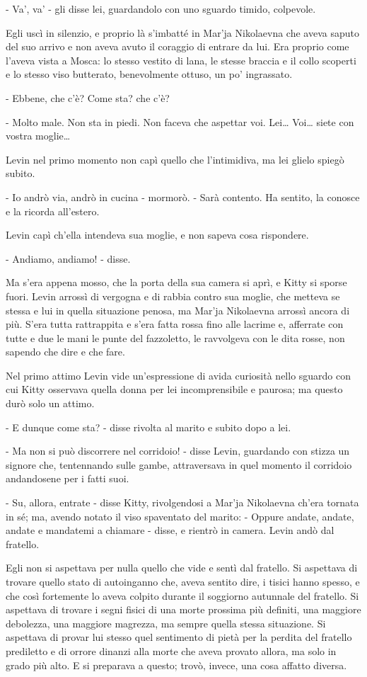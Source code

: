 - Va', va' - gli disse lei, guardandolo con uno sguardo timido, colpevole. 

Egli uscì in silenzio, e proprio là s'imbatté in Mar'ja Nikolaevna che aveva saputo del suo arrivo e non aveva avuto il coraggio di entrare da lui. Era proprio come l'aveva vista a Mosca: lo stesso vestito di lana, le stesse braccia e il collo scoperti e lo stesso viso butterato, benevolmente ottuso, un po' ingrassato. 

- Ebbene, che c'è? Come sta? che c'è? 

- Molto male. Non sta in piedi. Non faceva che aspettar voi. Lei\ldots{} Voi\ldots{} siete con vostra moglie\ldots{} 

Levin nel primo momento non capì quello che l'intimidiva, ma lei glielo spiegò subito. 

- Io andrò via, andrò in cucina - mormorò. - Sarà contento. Ha sentito, la conosce e la ricorda all'estero. 

Levin capì ch'ella intendeva sua moglie, e non sapeva cosa rispondere. 

- Andiamo, andiamo! - disse. 

Ma s'era appena mosso, che la porta della sua camera si aprì, e Kitty si sporse fuori. Levin arrossì di vergogna e di rabbia contro sua moglie, che metteva se stessa e lui in quella situazione penosa, ma Mar'ja Nikolaevna arrossì ancora di più. S'era tutta rattrappita e s'era fatta rossa fino alle lacrime e, afferrate con tutte e due le mani le punte del fazzoletto, le ravvolgeva con le dita rosse, non sapendo che dire e che fare. 

Nel primo attimo Levin vide un'espressione di avida curiosità nello sguardo con cui Kitty osservava quella donna per lei incomprensibile e paurosa; ma questo durò solo un attimo. 

- E dunque come sta? - disse rivolta al marito e subito dopo a lei. 

- Ma non si può discorrere nel corridoio! - disse Levin, guardando con stizza un signore che, tentennando sulle gambe, attraversava in quel momento il corridoio andandosene per i fatti suoi. 

- Su, allora, entrate - disse Kitty, rivolgendosi a Mar'ja Nikolaevna ch'era tornata in sé; ma, avendo notato il viso spaventato del marito: - Oppure andate, andate, andate e mandatemi a chiamare - disse, e rientrò in camera. Levin andò dal fratello. 

Egli non si aspettava per nulla quello che vide e sentì dal fratello. Si aspettava di trovare quello stato di autoinganno che, aveva sentito dire, i tisici hanno spesso, e che così fortemente lo aveva colpito durante il soggiorno autunnale del fratello. Si aspettava di trovare i segni fisici di una morte prossima più definiti, una maggiore debolezza, una maggiore magrezza, ma sempre quella stessa situazione. Si aspettava di provar lui stesso quel sentimento di pietà per la perdita del fratello prediletto e di orrore dinanzi alla morte che aveva provato allora, ma solo in grado più alto. E si preparava a questo; trovò, invece, una cosa affatto diversa. 

